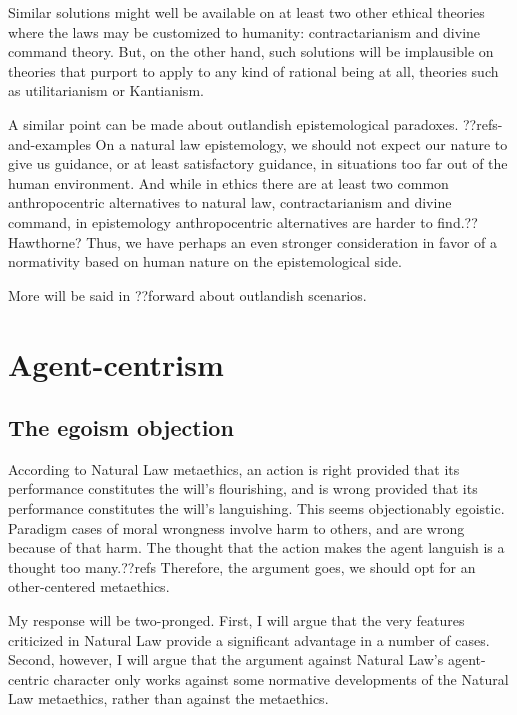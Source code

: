 Similar solutions might well be available on at least two other ethical theories where the laws may be customized
to humanity: contractarianism and divine command theory. But, on the other hand, such solutions will be
implausible on theories that purport to apply to any kind of rational being at all, theories such as utilitarianism
or Kantianism. 

A similar point can be made about outlandish epistemological paradoxes. ??refs-and-examples  On a natural law epistemology, we should not expect our nature to give us guidance, or at least satisfactory guidance, 
in situations too far out of the human environment. And while in ethics there are at least two common anthropocentric alternatives to natural law, contractarianism and divine command, in epistemology anthropocentric alternatives are harder to find.??Hawthorne?
Thus, we have perhaps an even stronger consideration in favor of a normativity based on human nature on the epistemological
side. 

More will be said in ??forward about outlandish scenarios.

\section{Agent-centrism}
\subsection{The egoism objection}
According to Natural Law metaethics, an action is right provided that its performance constitutes the will's flourishing,
and is wrong provided that its performance constitutes the will's languishing. This seems objectionably egoistic. Paradigm
cases of moral wrongness involve harm to others, and are wrong because of that harm. The thought that the action makes the 
agent languish is a thought too many.??refs Therefore, the argument goes, we should opt for an other-centered metaethics.

My response will be two-pronged. First, I will argue that the very features criticized in Natural Law provide a significant advantage
in a number of cases. Second, however, I will argue that the argument against Natural Law's agent-centric character only works
against some normative developments of the Natural Law metaethics, rather than against the metaethics. 

